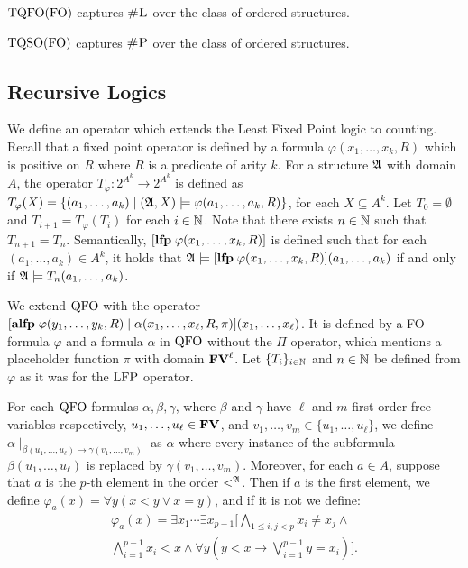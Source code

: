 \begin{theorem} \label{tqfo-fo-cap}
	${\rm TQFO}({\rm FO})$ captures $\text{\sc \#L}$ over the class of ordered structures.
\end{theorem}

\begin{theorem} \label{tqso-fo-cap}
	${\rm TQSO}({\rm FO})$ captures $\text{\sc \#P}$ over the class of ordered structures.
\end{theorem}


\subsection{Recursive Logics}

We define an operator which extends the Least Fixed Point logic to counting. Recall that a fixed point operator is defined by a formula $\varphi(x_1,\ldots,x_k,R)$ which is positive on $R$ where $R$ is a predicate of arity $k$. For a structure $\mathfrak{A}$ with domain $A$, the operator $T_{\varphi}:2^{A^k} \to 2^{A^k}$ is defined as $T_{\varphi}(X) = \{(a_1,\ldots,a_k)\mid (\mathfrak{A},X)\models \varphi(a_1,\ldots,a_k,R) \}$, for each $X\subseteq A^k$. Let $T_0 = \emptyset$ and $T_{i+1} = T_{\varphi}(T_i)$ for each $i \in \mathbb{N}$. Note that there exists $n\in \mathbb{N}$ such that $T_{n+1} = T_n$. Semantically, $[{\bf lfp} \;\varphi(x_1,\ldots,x_k,R)]$ is defined such that for each $(a_1,\ldots,a_k)\in A^k$, it holds that $\mathfrak{A}\models[{\bf lfp} \;\varphi(x_1,\ldots,x_k,R)](a_1,\ldots,a_k)$ if and only if $\mathfrak{A}\models T_n(a_1,\ldots,a_k)$.

We extend ${\rm QFO}$ with the operator $[{\bf alfp} \;\varphi(y_1,\ldots,y_k,R)\mid\alpha(x_1,\ldots,x_{\ell},R,\pi)](x_1,\ldots,x_{\ell})$. It is defined by a FO-formula $\varphi$ and a formula $\alpha$ in ${\rm QFO}$ without the $\Pi$ operator, which mentions a placeholder function $\pi$ with domain $\mathbf{FV}^{\ell}$. Let $\{T_i\}_{i\in\mathbb{N}}$ and $n\in\mathbb{N}$ be defined from $\varphi$ as it was for the ${\rm LFP}$ operator.


For each ${\rm QFO}$ formulas $\alpha, \beta, \gamma$, where $\beta$ and $\gamma$ have $\ell$ and $m$ first-order free variables respectively, $u_1,\ldots,u_{\ell} \in \mathbf{FV}$, and $v_1,\ldots,v_m \in \{u_1,\ldots,u_{\ell}\}$, we define $\alpha\mid_{\beta(u_1,\ldots,u_{\ell})\to\gamma(v_1,\ldots,v_{m})}$ as $\alpha$ where every instance of the subformula $\beta(u_1,\ldots,u_{\ell})$ is replaced by $\gamma(v_1,\ldots,v_{m})$. Moreover, for each $a\in A$, suppose that $a$ is the $p$-th element in the order $<^{\mathfrak{A}}$. Then if $a$ is the first element, we define $\varphi_a(x) = \forall y(x < y \vee x = y)$, and if it is not we define:
\begin{multline*}
\varphi_a(x) = \exists x_1 \cdots \exists x_{p-1}[\bigwedge_{1\leq i,j < p}x_i\neq x_j \wedge\,\\ \bigwedge_{i = 1}^{p-1} x_i < x  \wedge \forall y(y < x \to \bigvee_{i = 1}^{p-1} y = x_i)].
\end{multline*}


